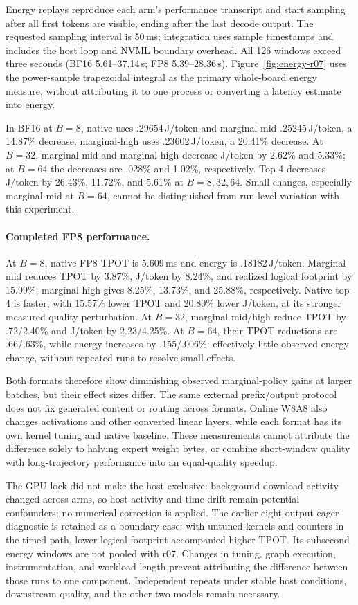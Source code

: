\documentclass[10pt,twocolumn]{article}
\begin{document}
Energy replays reproduce each arm's performance transcript and start sampling after all first tokens are visible, ending after the last decode output. The requested sampling interval is 50\,ms; integration uses sample timestamps and includes the host loop and NVML boundary overhead. All 126 windows exceed three seconds (BF16 5.61--37.14\,s; FP8 5.39--28.36\,s). Figure~\ref{fig:energy-r07} uses the power-sample trapezoidal integral as the primary whole-board energy measure, without attributing it to one process or converting a latency estimate into energy.

In BF16 at $B=8$, native uses .29654\,J/token and marginal-mid .25245\,J/token, a 14.87\% decrease; marginal-high uses .23602\,J/token, a 20.41\% decrease. At $B=32$, marginal-mid and marginal-high decrease J/token by 2.62\% and 5.33\%; at $B=64$ the decreases are .028\% and 1.02\%, respectively. Top-4 decreases J/token by 26.43\%, 11.72\%, and 5.61\% at $B=8,32,64$. Small changes, especially marginal-mid at $B=64$, cannot be distinguished from run-level variation with this experiment.

\paragraph{Completed FP8 performance.}
At $B=8$, native FP8 TPOT is 5.609\,ms and energy is .18182\,J/token. Marginal-mid reduces TPOT by 3.87\%, J/token by 8.24\%, and realized logical footprint by 15.99\%; marginal-high gives 8.25\%, 13.73\%, and 25.88\%, respectively. Native top-4 is faster, with 15.57\% lower TPOT and 20.80\% lower J/token, at its stronger measured quality perturbation. At $B=32$, marginal-mid/high reduce TPOT by .72/2.40\% and J/token by 2.23/4.25\%. At $B=64$, their TPOT reductions are .66/.63\%, while energy increases by .155/.006\%: effectively little observed energy change, without repeated runs to resolve small effects.

Both formats therefore show diminishing observed marginal-policy gains at larger batches, but their effect sizes differ. The same external prefix/output protocol does not fix generated content or routing across formats. Online W8A8 also changes activations and other converted linear layers, while each format has its own kernel tuning and native baseline. These measurements cannot attribute the difference solely to halving expert weight bytes, or combine short-window quality with long-trajectory performance into an equal-quality speedup.

The GPU lock did not make the host exclusive: background download activity changed across arms, so host activity and time drift remain potential confounders; no numerical correction is applied. The earlier eight-output eager diagnostic is retained as a boundary case: with untuned kernels and counters in the timed path, lower logical footprint accompanied higher TPOT. Its subsecond energy windows are not pooled with r07. Changes in tuning, graph execution, instrumentation, and workload length prevent attributing the difference between those runs to one component. Independent repeats under stable host conditions, downstream quality, and the other two models remain necessary.
\end{document}
